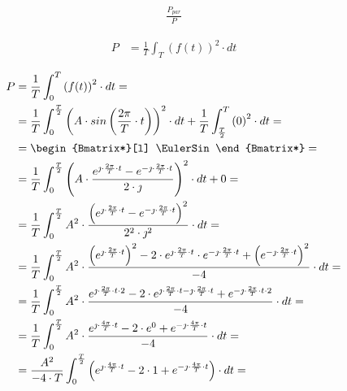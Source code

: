 \begin{task}

\begin{align*}
\frac{P_{par}}{P}
\end{align*}


\begin{align*}
P &= \frac{1}{T} \int_{T} \left(f(t)\right)^2 \cdot dt
\end{align*}


\begin{align*}
P &= \frac{1}{T} \int_{0}^{T} \left(f(t)\right)^2 \cdot dt = \\
&= \frac{1}{T} \int_{0}^{\frac{T}{2}} \left(A \cdot sin\left( \frac{2\pi}{T} \cdot t\right) \right)^2 \cdot dt + \frac{1}{T} \int_{\frac{T}{2}}^{T} \left(0 \right)^2 \cdot dt= \\
&=\begin{Bmatrix*}[l]
\EulerSin
\end{Bmatrix*}=\\
&= \frac{1}{T} \int_{0}^{\frac{T}{2}} \left(A \cdot 
\frac{e^{\jmath \cdot \frac{2\pi}{T} \cdot t} - e^{-\jmath \cdot \frac{2\pi}{T} \cdot t}}{2 \cdot \jmath} \right)^2 \cdot dt + 0= \\
&=\frac{1}{T} \int_{0}^{\frac{T}{2}} A^2 \cdot 
\frac{\left(e^{\jmath \cdot \frac{2\pi}{T} \cdot t} - e^{-\jmath \cdot \frac{2\pi}{T} \cdot t}\right)^2}{2^2 \cdot \jmath^2} \cdot dt =\\
&=\frac{1}{T} \int_{0}^{\frac{T}{2}} A^2 \cdot 
\frac{\left(e^{\jmath \cdot \frac{2\pi}{T} \cdot t}\right)^2 -2 \cdot e^{\jmath \cdot \frac{2\pi}{T} \cdot t} \cdot e^{-\jmath \cdot \frac{2\pi}{T} \cdot t} + \left( e^{-\jmath \cdot \frac{2\pi}{T} \cdot t}\right)^2}{-4} \cdot dt =\\
&=\frac{1}{T} \int_{0}^{\frac{T}{2}} A^2 \cdot 
\frac{e^{\jmath \cdot \frac{2\pi}{T} \cdot t \cdot 2} -2 \cdot e^{\jmath \cdot \frac{2\pi}{T} \cdot t -\jmath \cdot \frac{2\pi}{T} \cdot t} + e^{-\jmath \cdot \frac{2\pi}{T} \cdot t \cdot 2}}{-4} \cdot dt =\\
&=\frac{1}{T} \int_{0}^{\frac{T}{2}} A^2 \cdot 
\frac{e^{\jmath \cdot \frac{4\pi}{T} \cdot t} -2 \cdot e^{0} + e^{-\jmath \cdot \frac{4\pi}{T} \cdot t}}{-4} \cdot dt =\\
&=\frac{A^2}{-4 \cdot T} \int_{0}^{\frac{T}{2}}\left( 
e^{\jmath \cdot \frac{4\pi}{T} \cdot t} -2 \cdot 1 + e^{-\jmath \cdot \frac{4\pi}{T} \cdot t}\right) \cdot dt =\\

\end{align*}
\end{task}
